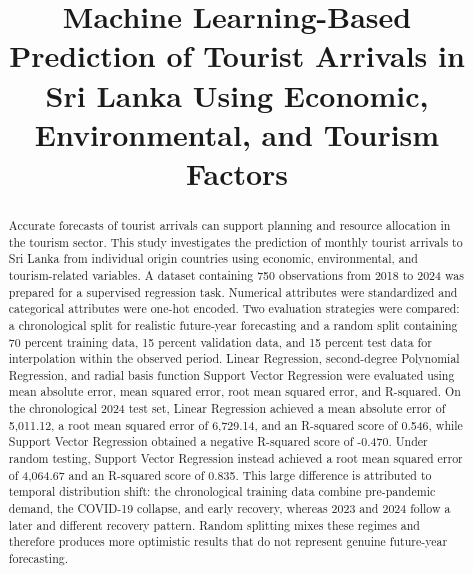 \documentclass[conference,a4paper]{IEEEtran}
\begin{document}
\title{Machine Learning-Based Prediction of Tourist Arrivals in Sri Lanka Using Economic, Environmental, and Tourism Factors}

\author{
}

\maketitle

\begin{abstract}
Accurate forecasts of tourist arrivals can support planning and resource allocation in the tourism sector. This study investigates the prediction of monthly tourist arrivals to Sri Lanka from individual origin countries using economic, environmental, and tourism-related variables. A dataset containing 750 observations from 2018 to 2024 was prepared for a supervised regression task. Numerical attributes were standardized and categorical attributes were one-hot encoded. Two evaluation strategies were compared: a chronological split for realistic future-year forecasting and a random split containing 70 percent training data, 15 percent validation data, and 15 percent test data for interpolation within the observed period. Linear Regression, second-degree Polynomial Regression, and radial basis function Support Vector Regression were evaluated using mean absolute error, mean squared error, root mean squared error, and R-squared. On the chronological 2024 test set, Linear Regression achieved a mean absolute error of 5,011.12, a root mean squared error of 6,729.14, and an R-squared score of 0.546, while Support Vector Regression obtained a negative R-squared score of -0.470. Under random testing, Support Vector Regression instead achieved a root mean squared error of 4,064.67 and an R-squared score of 0.835. This large difference is attributed to temporal distribution shift: the chronological training data combine pre-pandemic demand, the COVID-19 collapse, and early recovery, whereas 2023 and 2024 follow a later and different recovery pattern. Random splitting mixes these regimes and therefore produces more optimistic results that do not represent genuine future-year forecasting.
\end{abstract}
\end{document}
